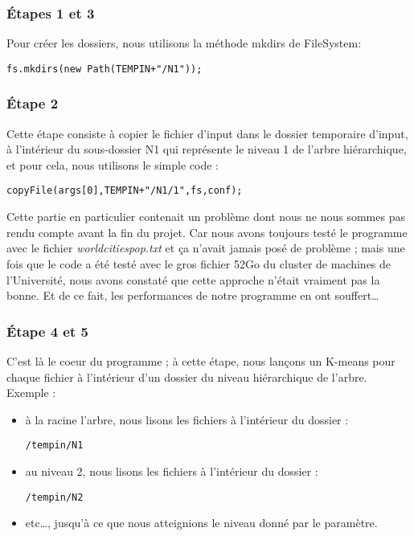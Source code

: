 \documentclass[12pt]{article}
\begin{document}
\subsubsection{Étapes 1 et 3}
\label{sec:org278f684}

Pour créer les dossiers, nous utilisons la méthode mkdirs de FileSystem:

\begin{verbatim}
fs.mkdirs(new Path(TEMPIN+"/N1"));
\end{verbatim}

\subsubsection{Étape 2}
\label{sec:org4cebcfd}

Cette étape consiste à copier le fichier d'input dans le dossier temporaire d'input, à l'intérieur du sous-dossier N1 qui représente le 
niveau 1 de l'arbre hiérarchique, et pour cela, nous utilisons le simple code : 

\begin{verbatim}
copyFile(args[0],TEMPIN+"/N1/1",fs,conf);
\end{verbatim}

  Cette partie en particulier contenait un problème dont nous ne nous sommes pas rendu compte avant la fin du projet. Car nous avons toujours
testé le programme avec le fichier \emph{worldcitiespop.txt} et ça n'avait jamais posé de problème ; mais une fois que le code a été testé avec 
le gros fichier 52Go du cluster de machines de l'Université, nous avons constaté que cette approche n'était vraiment pas la bonne. 
Et de ce fait, les performances de notre programme en ont souffert\ldots{} 

\subsubsection{Étape 4 et 5}
\label{sec:org6f965fa}
C'est là le coeur du programme ; à cette étape, nous lançons un K-means pour chaque fichier à l'intérieur d'un dossier du niveau
hiérarchique de l'arbre. Exemple : 

\begin{itemize}
\item à la racine l'arbre, nous lisons les fichiers à l'intérieur du dossier : 

\begin{verbatim}
/tempin/N1
\end{verbatim}

\item au niveau 2, nous lisons les fichiers à l'intérieur du dossier :

\begin{verbatim}
/tempin/N2
\end{verbatim}

\item etc\ldots{}, jusqu'à ce que nous atteignions le niveau donné par le paramètre.
\end{itemize}
\end{document}
